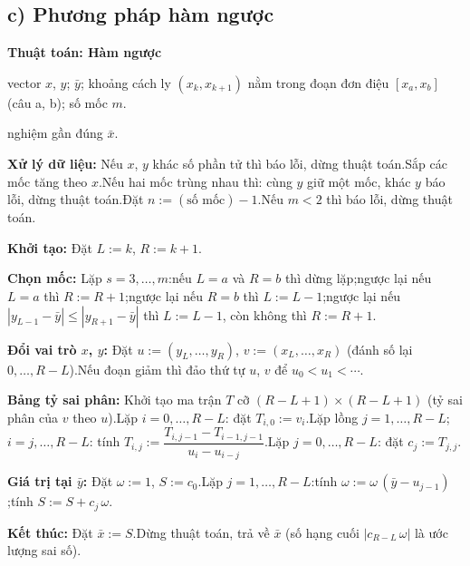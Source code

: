 \documentclass[11pt,a4paper]{article}
\newenvironment{thuattoan}[1]
  {\par\medskip\noindent\textbf{Thuật toán: #1}\begin{description}[style=standard,align=left,leftmargin=4.3em,labelwidth=3.9em,labelsep=0.4em,itemsep=1pt,topsep=3pt,font=\normalfont\bfseries]}
  {\end{description}}
\newcommand{\thut}{\newline\hspace*{1.2em}}
\begin{document}
\subsection{c) Phương pháp hàm ngược}
\begin{thuattoan}{Hàm ngược}
\item[Input:] vector $x$, $y$; $\bar y$; khoảng cách ly $(x_k,x_{k+1})$ nằm trong đoạn đơn điệu $[x_a,x_b]$ (câu a, b); số mốc $m$.
\item[Output:] nghiệm gần đúng $\bar x$.
\item[Bước 0:] \textbf{Xử lý dữ liệu:} Nếu $x$, $y$ khác số phần tử thì báo lỗi, dừng thuật toán.\newline Sắp các mốc tăng theo $x$.\newline Nếu hai mốc trùng nhau thì: cùng $y$ giữ một mốc, khác $y$ báo lỗi, dừng thuật toán.\newline Đặt $n:=(\text{số mốc})-1$.\newline Nếu $m<2$ thì báo lỗi, dừng thuật toán.
\item[Bước 1:] \textbf{Khởi tạo:} Đặt $L:=k$, $R:=k+1$.
\item[Bước 2:] \textbf{Chọn mốc:} Lặp $s=3,\dots,m$:\thut nếu $L=a$ và $R=b$ thì dừng lặp;\thut ngược lại nếu $L=a$ thì $R:=R+1$;\thut ngược lại nếu $R=b$ thì $L:=L-1$;\thut ngược lại nếu $|y_{L-1}-\bar y|\le|y_{R+1}-\bar y|$ thì $L:=L-1$, còn không thì $R:=R+1$.
\item[Bước 3:] \textbf{Đổi vai trò $x$, $y$:} Đặt $u:=(y_L,\dots,y_R)$, $v:=(x_L,\dots,x_R)$ (đánh số lại $0,\dots,R-L$).\newline Nếu đoạn giảm thì đảo thứ tự $u$, $v$ để $u_0<u_1<\cdots$.
\item[Bước 4:] \textbf{Bảng tỷ sai phân:} Khởi tạo ma trận $T$ cỡ $(R-L+1)\times(R-L+1)$ (tỷ sai phân của $v$ theo $u$).\newline Lặp $i=0,\dots,R-L$: đặt $T_{i,0}:=v_i$.\newline Lặp lồng $j=1,\dots,R-L$; $i=j,\dots,R-L$: tính $T_{i,j}:=\dfrac{T_{i,j-1}-T_{i-1,j-1}}{u_i-u_{i-j}}$.\newline Lặp $j=0,\dots,R-L$: đặt $c_j:=T_{j,j}$.
\item[Bước 5:] \textbf{Giá trị tại $\bar y$:} Đặt $\omega:=1$, $S:=c_0$.\newline Lặp $j=1,\dots,R-L$:\thut tính $\omega:=\omega\,(\bar y-u_{j-1})$;\thut tính $S:=S+c_j\,\omega$.
\item[Bước 6:] \textbf{Kết thúc:} Đặt $\bar x:=S$.\newline Dừng thuật toán, trả về $\bar x$ (số hạng cuối $|c_{R-L}\,\omega|$ là ước lượng sai số).
\end{thuattoan}
\end{document}
